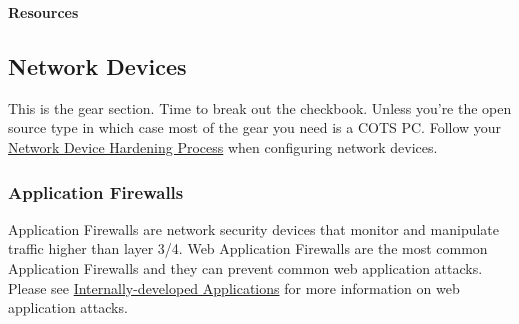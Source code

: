 \textbf{Resources}
\begin{enumerate}
\end{enumerate}
\subsection{Network Devices}
This is the gear section. Time to break out the checkbook. Unless you're the open source type in which case most of the gear you need is a COTS PC. Follow your \hyperref[subsec:"Network Device Hardening Process"]{Network Device Hardening Process} when configuring network devices.
\subsubsection{Application Firewalls}
Application Firewalls are network security devices that monitor and manipulate traffic higher than layer 3/4. Web Application Firewalls are the most common Application Firewalls and they can prevent common web application attacks. Please see \hyperref[subsec:"Internally-developed Applications"]{Internally-developed Applications} for more information on web application attacks.
